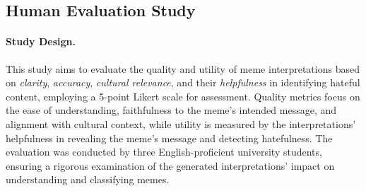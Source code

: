 \subsection{Human Evaluation Study} 

\paragraph{Study Design.} 

This study aims to evaluate the quality and utility of meme interpretations based on \textit{clarity}, \textit{accuracy}, \textit{cultural relevance}, and their \textit{helpfulness} in identifying hateful content, employing a 5-point Likert scale for assessment. Quality metrics focus on the ease of understanding, faithfulness to the meme's intended message, and alignment with cultural context, while utility is measured by the interpretations' helpfulness in revealing the meme's message and detecting hatefulness. The evaluation was conducted by three English-proficient university students, ensuring a rigorous examination of the generated interpretations' impact on understanding and classifying memes.


